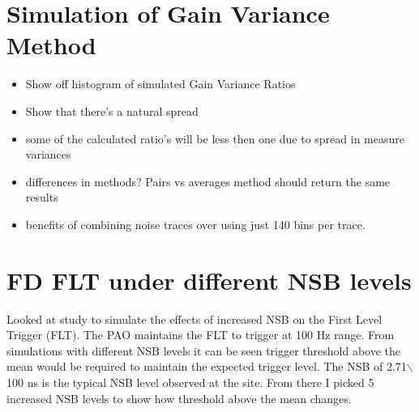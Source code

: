 \section{Simulation of Gain Variance Method}

\begin{itemize}
\item Show off histogram of simulated Gain Variance Ratios
\item Show that there's a natural spread
\item some of the calculated ratio's will be less then one due to spread in measure variances
\item differences in methods? Pairs vs averages method should return the same results
\item benefits of combining noise traces over using just 140 bins per trace.
\end{itemize}

\section{FD FLT under different NSB levels}

Looked at study to simulate the effects of increased NSB on the First Level Trigger (FLT). The PAO maintains the FLT to trigger at 100 Hz range. From simulations with different NSB levels it can be seen trigger threshold above the mean would be required to maintain the expected trigger level. The NSB of 2.71$\backslash$100 ns is the typical NSB level observed at the site. From there I picked 5 increased NSB levels to show how threshold above the mean changes. 


